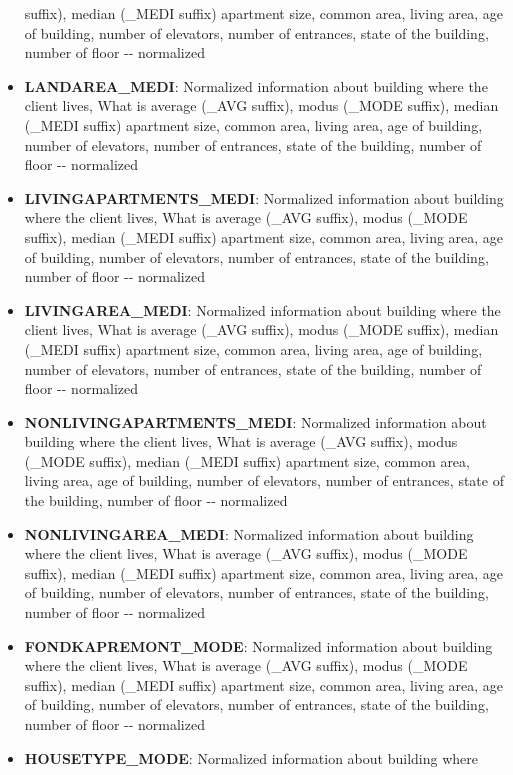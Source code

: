 \documentclass[11pt]{article}
\begin{document}
\begin{itemize}
  suffix), median (\_MEDI suffix) apartment size, common area, living
  area, age of building, number of elevators, number of entrances, state
  of the building, number of floor -\/- normalized
\item
  \textbf{LANDAREA\_MEDI}: Normalized information about building where
  the client lives, What is average (\_AVG suffix), modus (\_MODE
  suffix), median (\_MEDI suffix) apartment size, common area, living
  area, age of building, number of elevators, number of entrances, state
  of the building, number of floor -\/- normalized
\item
  \textbf{LIVINGAPARTMENTS\_MEDI}: Normalized information about building
  where the client lives, What is average (\_AVG suffix), modus (\_MODE
  suffix), median (\_MEDI suffix) apartment size, common area, living
  area, age of building, number of elevators, number of entrances, state
  of the building, number of floor -\/- normalized
\item
  \textbf{LIVINGAREA\_MEDI}: Normalized information about building where
  the client lives, What is average (\_AVG suffix), modus (\_MODE
  suffix), median (\_MEDI suffix) apartment size, common area, living
  area, age of building, number of elevators, number of entrances, state
  of the building, number of floor -\/- normalized
\item
  \textbf{NONLIVINGAPARTMENTS\_MEDI}: Normalized information about
  building where the client lives, What is average (\_AVG suffix), modus
  (\_MODE suffix), median (\_MEDI suffix) apartment size, common area,
  living area, age of building, number of elevators, number of
  entrances, state of the building, number of floor -\/- normalized
\item
  \textbf{NONLIVINGAREA\_MEDI}: Normalized information about building
  where the client lives, What is average (\_AVG suffix), modus (\_MODE
  suffix), median (\_MEDI suffix) apartment size, common area, living
  area, age of building, number of elevators, number of entrances, state
  of the building, number of floor -\/- normalized
\item
  \textbf{FONDKAPREMONT\_MODE}: Normalized information about building
  where the client lives, What is average (\_AVG suffix), modus (\_MODE
  suffix), median (\_MEDI suffix) apartment size, common area, living
  area, age of building, number of elevators, number of entrances, state
  of the building, number of floor -\/- normalized
\item
  \textbf{HOUSETYPE\_MODE}: Normalized information about building where

\end{itemize}
\end{document}
